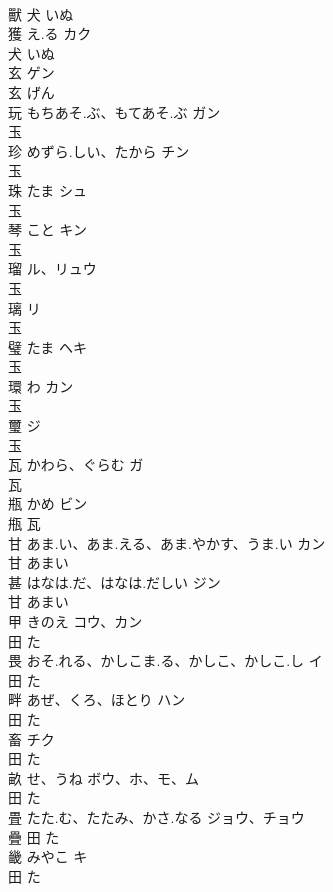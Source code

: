 \documentclass[8pt]{extreport}
\begin{document}
\begin{CJK}{UTF8}{min}
\\	獸	犬		いぬ		
\\	獲	え.る	カク	
\\	犬		いぬ		
\\	玄		ゲン	
\\	玄		げん		
\\	玩	もちあそ.ぶ、もてあそ.ぶ	ガン	
\\	玉				
\\	珍	めずら.しい、たから	チン	
\\	玉				
\\	珠	たま	シュ	
\\	玉				
\\	琴	こと	キン	
\\	玉				
\\	瑠		ル、リュウ	
\\	玉				
\\	璃		リ	
\\	玉				
\\	璧	たま	ヘキ	
\\	玉				
\\	環	わ	カン	
\\	玉				
\\	璽		ジ	
\\	玉				
\\	瓦	かわら、ぐらむ	ガ	
\\	瓦		
\\	瓶	かめ	ビン	
\\	甁	瓦		
\\	甘	あま.い、あま.える、あま.やかす、うま.い	カン	
\\	甘		あまい		
\\	甚	はなは.だ、はなは.だしい	ジン	
\\	甘		あまい		
\\	甲	きのえ	コウ、カン	
\\	田		た		
\\	畏	おそ.れる、かしこま.る、かしこ、かしこ.し	イ	
\\	田		た		
\\	畔	あぜ、くろ、ほとり	ハン	
\\	田		た		
\\	畜		チク	
\\	田		た		
\\	畝	せ、うね	ボウ、ホ、モ、ム	
\\	田		た		
\\	畳	たた.む、たたみ、かさ.なる	ジョウ、チョウ	
\\	疊	田		た		
\\	畿	みやこ	キ	
\\	田		た		

\end{CJK}
\end{document}
